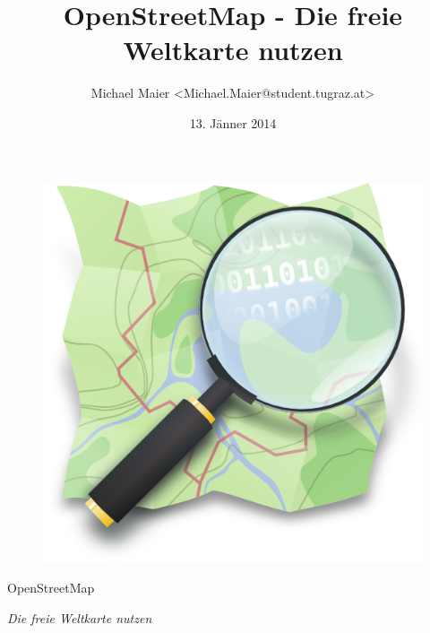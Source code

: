 \documentclass{beamer}
\title{OpenStreetMap - Die freie Weltkarte nutzen}
\author{Michael Maier \textless Michael.Maier@student.tugraz.at\textgreater}
\date{13. Jänner 2014}
\begin{document}

\begin{frame} 


\begin{figure}
  \centering
  \includegraphics[width=.5\textwidth]{mag_map.png}
\end{figure}

\begin{center}
\Huge{OpenStreetMap\\}
\end{center}

\begin{center}
\Large{\emph{Die freie Weltkarte nutzen}}
\end{center}

\end{frame}



%

%
\end{document}

